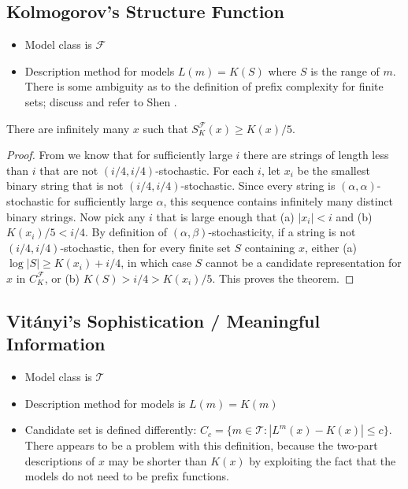 \documentclass{style/llncs}
\newcommand{\T}{\mathscr T}
\newcommand{\F}{\mathscr F}
\begin{document}
\subsection{Kolmogorov's Structure Function}

\begin{itemize}
\item Model class is $\F$
\item Description method for models $L(m)=K(S)$ where $S$ is the range
  of $m$. There is some ambiguity as to the definition of prefix
  complexity for finite sets; discuss and refer to Shen \cite{TODO}.
\end{itemize}

\begin{theorem}
There are infinitely many $x$ such that $S^\F_K(x) \geq K(x)/5$. \label{theorem:structure-function-is-not-bounded}
\end{theorem}
\begin{proof}
From \cite[Proposition~I.3 (b)]{gacs2001algorithmic} we know that for sufficiently large $i$ there are strings of length less than $i$ that are not $(i/4, i/4)$-stochastic. For each $i$, let $x_i$ be the smallest binary string that is not $(i/4, i/4)$-stochastic. Since every string is $(\alpha,\alpha)$-stochastic for sufficiently large $\alpha$, this sequence contains infinitely many distinct binary strings. Now pick any $i$ that is large enough that (a) $|x_i|<i$ and (b) $K(x_i)/5 < i/4$. By definition of $(\alpha,\beta)$-stochasticity, if a string is not $(i/4,i/4)$-stochastic, then for every finite set $S$ containing $x$, either (a) $\log|S|\ge K(x_i)+i/4$, in which case $S$ cannot be a candidate representation for $x$ in $C^\F_K$, or (b) $K(S)>i/4>K(x_i)/5$. This proves the theorem.
\end{proof}

\subsection{Vit\'anyi's Sophistication / Meaningful Information}

\begin{itemize}
\item Model class is $\T$
\item Description method for models is $L(m)=K(m)$
\item Candidate set is defined differently: $C_c=\{m\in\T:|L^m(x)-K(x)|\le
  c\}$. There appears to be a problem with this definition, because
  the two-part descriptions of $x$ may be shorter than $K(x)$ by
  exploiting the fact that the models do not need to be prefix functions.
\end{itemize}
\end{document}
